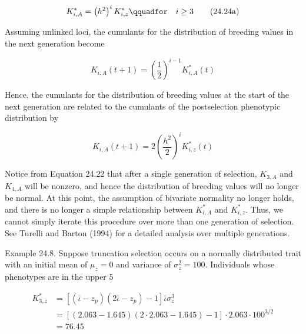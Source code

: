 \documentclass{article}
\begin{document}
\begin{equation}
K_{i,A}^{*}=\left(h^{2}\right)^{i}K_{i,z}^{*}\qquadfor\quad i\geq3
\tag{24.24a}
\label{eq:24_24a}
\end{equation}

Assuming unlinked loci, the cumulants for the distribution of breeding values in the next generation become

\begin{equation}
K_{i,A}(t+1)=\left(\frac{1}{2}\right)^{i-1}K_{i,A}^{*}(t)
\tag{24.24b}
\label{eq:24_24b}
\end{equation}

Hence, the cumulants for the distribution of breeding values at the start of the next generation are related to the cumulants of the postselection phenotypic distribution by

\begin{equation}
K_{i,A}(t+1)=2\left(\frac{h^{2}}{2}\right)^{i}K_{i,z}^{*}(t)
\tag{24.24c}
\label{eq:24_24c}
\end{equation}

Notice from Equation 24.22 that after a single generation of selection,  $ K_{3,A} $ and  $ K_{4,A} $ will be nonzero, and hence the distribution of breeding values will no longer be normal. At this point, the assumption of bivariate normality no longer holds, and there is no longer a simple relationship between  $ K_{i,A}^{*} $ and  $ K_{i,z}^{*} $. Thus, we cannot simply iterate this procedure over more than one generation of selection. See Turelli and Barton (1994) for a detailed analysis over multiple generations.

Example 24.8. Suppose truncation selection occurs on a normally distributed trait with an initial mean of  $ \mu_z = 0 $ and variance of  $ \sigma_z^2 = 100 $. Individuals whose phenotypes are in the upper 5%

\begin{equation}
\begin{aligned}K_{3,z}^{*}&=[\left(\bar{\iota}-z_{p}\right)(2\bar{\iota}-z_{p})-1]\bar{\iota}\sigma_{z}^{3}\\&=\left[(2.063-1.645)(2\cdot2.063-1.645)-1\right]\cdot2.063\cdot100^{3/2}\\&=76.45\\ \end{aligned}
\end{equation}
\end{document}
